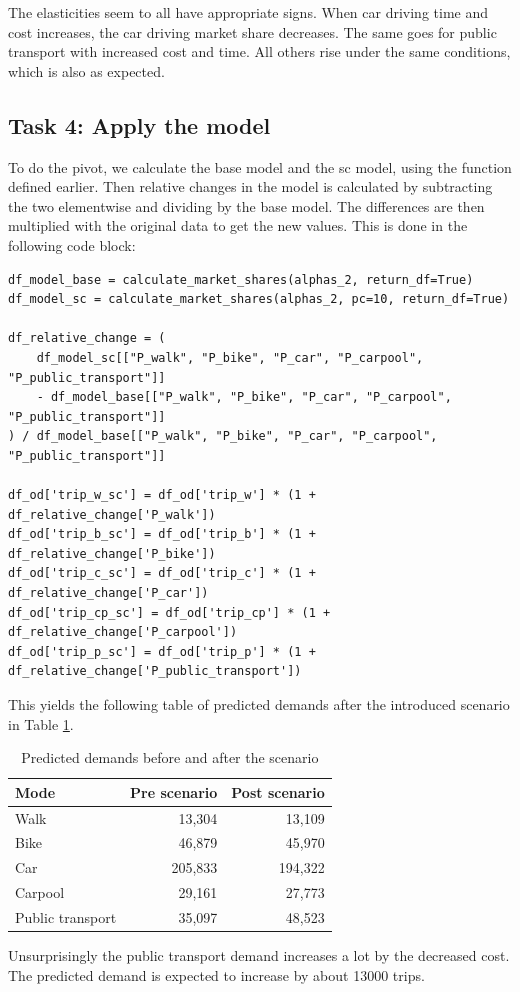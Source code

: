 \documentclass[a4paper,12pt]{article}
\begin{document}
The elasticities seem to all have appropriate signs. 
When car driving time and cost increases, the car driving market share decreases.
The same goes for public transport with increased cost and time.
All others rise under the same conditions, which is also as expected.

\subsection{Task 4: Apply the model}
To do the pivot, we calculate the base model and the sc model, using the function defined earlier.
Then relative changes in the model is calculated by subtracting the two elementwise and dividing by the base model.
The differences are then multiplied with the original data to get the new values.
This is done in the following code block:

\begin{verbatim}
df_model_base = calculate_market_shares(alphas_2, return_df=True)
df_model_sc = calculate_market_shares(alphas_2, pc=10, return_df=True)

df_relative_change = (
    df_model_sc[["P_walk", "P_bike", "P_car", "P_carpool", "P_public_transport"]]
    - df_model_base[["P_walk", "P_bike", "P_car", "P_carpool", "P_public_transport"]]
) / df_model_base[["P_walk", "P_bike", "P_car", "P_carpool", "P_public_transport"]]

df_od['trip_w_sc'] = df_od['trip_w'] * (1 + df_relative_change['P_walk'])
df_od['trip_b_sc'] = df_od['trip_b'] * (1 + df_relative_change['P_bike'])
df_od['trip_c_sc'] = df_od['trip_c'] * (1 + df_relative_change['P_car'])
df_od['trip_cp_sc'] = df_od['trip_cp'] * (1 + df_relative_change['P_carpool'])
df_od['trip_p_sc'] = df_od['trip_p'] * (1 + df_relative_change['P_public_transport'])
\end{verbatim}

This yields the following table of predicted demands after the introduced scenario in Table \ref{tab:predicted_demands}.

\begin{table}[h!]
    \centering
    \begin{tabular}{|l|r|r|}
        \hline
        \textbf{Mode} & \textbf{Pre scenario} & \textbf{Post scenario} \\
        \hline
        Walk & 13,304 & 13,109 \\
        \hline
        Bike & 46,879 & 45,970 \\
        \hline
        Car & 205,833 & 194,322 \\
        \hline
        Carpool & 29,161 & 27,773 \\
        \hline
        Public transport & 35,097 & 48,523 \\
        \hline
    \end{tabular}
    \caption{Predicted demands before and after the scenario}
    \label{tab:predicted_demands}
\end{table}

Unsurprisingly the public transport demand increases a lot by the decreased cost.
The predicted demand is expected to increase by about 13000 trips.
\end{document}
